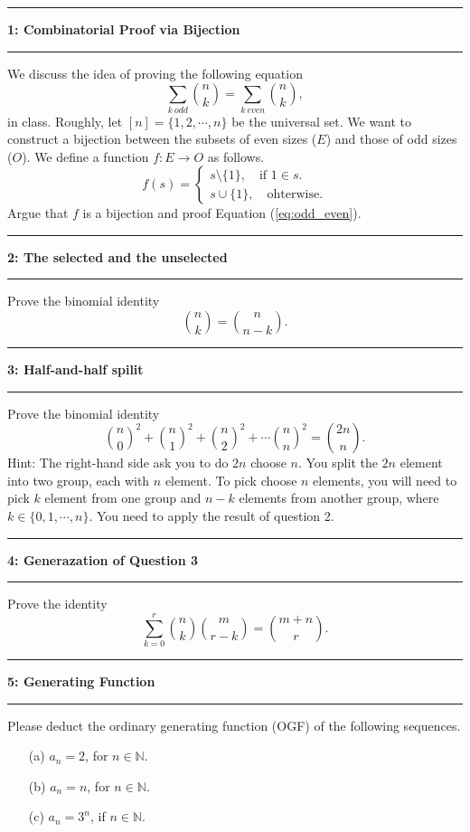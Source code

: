 \documentclass[11pt]{article}
\newcommand\question[2]{\vspace{.25in}\hrule\textbf{#1: #2}\vspace{.5em}\hrule\vspace{.10in}}
\newcommand{\N}{\mathbb{N}}
\begin{document}
\raggedright
\newcommand\NAME{Xiang Huang}  %
\newcommand\UISID{\texttt{UISid}}     %
\newcommand\HWNUM{7}              %



\question{1}{Combinatorial Proof via Bijection}
We discuss the idea of proving the following equation
\[\label{eq:odd_even}
    \sum_{k \ odd}\binom{n}{k} = \sum_{k\ even}\binom{n}{k}, \tag{1}
\]
in class. Roughly, let $[n]=\{1,2,\cdots, n\}$ be the universal set. We want to construct a bijection between the subsets of even sizes ($E$) and those of odd sizes ($O$). We define a function $f:E\to O$ as follows.
\[
    f(s)= \begin{cases}
         s\setminus \{1\}, \quad\text{if $1\in s$}.\\
         s\cup \{1\}, \quad\text{ohterwise.}
     \end{cases}
 \]
Argue that $f$ is a bijection and proof Equation (\ref{eq:odd_even}).

\question{2}{The selected and the unselected}
Prove the binomial identity
\[
    \binom{n}{k}=\binom{n}{n-k}.
\]
\question{3}{Half-and-half spilit}
Prove the binomial identity
\[
    \binom{n}{0}^2 + \binom{n}{1}^2 + \binom{n}{2}^2 + \cdots \binom{n}{n}^2 = \binom{2n}{n}.
\]
Hint: The right-hand side ask you to do $2n$ choose $n$. You split the $2n$ element into two group, each with $n$ element. To pick choose $n$ elements, you will need to pick $k$ element from one group and $n-k$ elements from another group, where $k\in \{0,1,\cdots, n\}$. You need to apply the result of question 2.

\question{4}{Generazation of Question 3}
Prove the identity
\[
    \sum_{k=0}^r \binom{n}{k}\binom{m}{r-k} = \binom{m+n}{r}.
\]

\question{5}{Generating Function}
Please deduct the ordinary generating function (OGF) of the following sequences.
\begin{enumerate}
    \item[(a)] $a_n = 2$, for $n\in \N$.
    \item[(b)] $a_n= n$, for $n\in \N$.
    \item[(c)] $a_n=3^n$, if $n \in \N$.
\end{enumerate}
\end{document}
